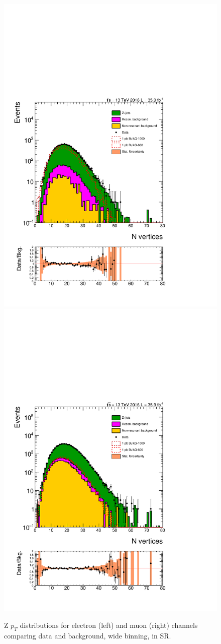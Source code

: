 \begin{figure}[htbp!]
\centering
\includegraphics[width=0.46\linewidth,page=9]{figures/ReMiniSummer16_DT_PhReMiniMCRcFixXsec_GMCPhPtWt_SRdPhiGT0p5_puWeightsummer16_muoneg_gjet_metfilter_unblind_el_log_1pb.pdf}
\includegraphics[width=0.46\linewidth,page=9]{figures/ReMiniSummer16_DT_PhReMiniMCRcFixXsec_GMCPhPtWt_SRdPhiGT0p5_puWeightsummer16_muoneg_gjet_metfilter_unblind_mu_log_1pb.pdf}
\caption{Z $p_T$ distributions for electron (left) and muon (right) channels
comparing data and background,
wide binning, in SR.}
\label{fig:SR_gjet_zpt_wide}
\end{figure}


